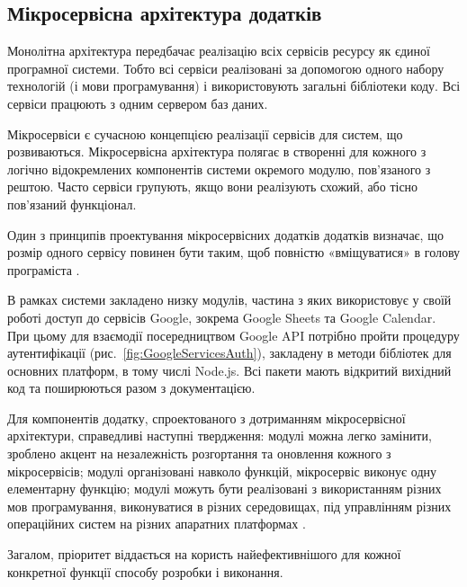 \subsection{Мікросервісна архітектура додатків} \label{subsec:microservices}

Монолітна архітектура передбачає реалізацію всіх сервісів ресурсу як єдиної програмної системи. Тобто всі сервіси реалізовані за допомогою одного набору технологій (і мови програмування) і використовують загальні бібліотеки коду. Всі сервіси працюють з одним сервером баз даних.

Мікросервіси є сучасною концепцією реалізації сервісів для систем, що розвиваються. Мікросервісна архітектура полягає в створенні для кожного з логічно відокремлених компонентів системи окремого модулю, пов'язаного з рештою. Часто сервіси групують, якщо вони реалізують схожий, або тісно пов'язаний функціонал.  

Один з принципів проектування мікросервісних додатків додатків визначає, що розмір одного сервісу повинен бути таким, щоб повністю «вміщуватися» в голову програміста \cite{приходченко2018обґрунтування}.

В рамках системи закладено низку модулів, частина з яких використовує у своїй роботі доступ до сервісів Google, зокрема Google Sheets та Google Calendar. При цьому для взаємодії посередництвом Google API потрібно пройти процедуру аутентифікації (рис.~\ref{fig:GoogleServicesAuth}), закладену в методи бібліотек для основних платформ, в тому числі Node.js. Всі пакети мають відкритий вихідний код та поширюються разом з документацією.


Для компонентів додатку, спроектованого з дотриманням мікросервісної архітектури, справедливі наступні твердження: модулі можна легко замінити, зроблено акцент на незалежність розгортання та оновлення кожного з мікросервісів; модулі організовані навколо функцій, мікросервіс виконує одну елементарну функцію; модулі можуть бути реалізовані з використанням різних мов програмування, виконуватися в різних середовищах, під управлінням різних операційних систем на різних апаратних платформах \cite[159]{кучер2018мікросервісна}.

Загалом, пріоритет віддається на користь найефективнішого для кожної конкретної функції способу розробки і виконання.
